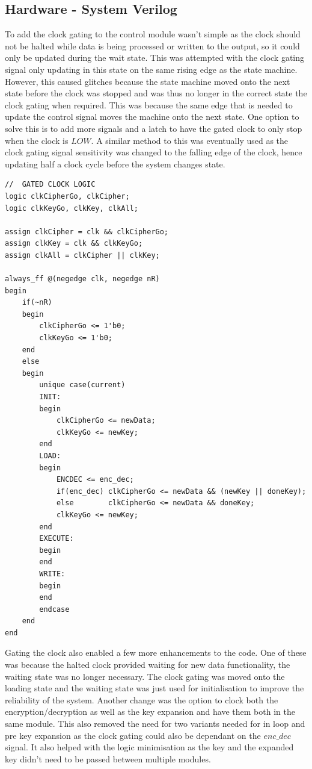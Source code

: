 \documentclass[12pt,twoside,a4paper]{report}
\begin{document}
	\subsection{Hardware - System Verilog}
	\label{subsection:SV2}
	
	To add the clock gating to the control module wasn't simple as the clock should not be halted while data is being processed or written to the output, so it could only be updated during the wait state. This was attempted with the clock gating signal only updating in this state on the same rising edge as the state machine. However, this caused glitches because the state machine moved onto the next state before the clock was stopped and was thus no longer in the correct state the clock gating when required. This was because the same edge that is needed to update the control signal moves the machine onto the next state. One option to solve this is to add more signals and a latch to have the gated clock to only stop when the clock is $LOW$. A similar method to this was eventually used as the clock gating signal sensitivity was changed to the falling edge of the clock, hence updating half a clock cycle before the system changes state.

	\begin{minipage}{\linewidth}
	\begin{lstlisting}[label={lst:Clock_Gating},caption={The next state logic for the ($PRE$) control module},style=SVStyle]
//	GATED CLOCK LOGIC
logic clkCipherGo, clkCipher;
logic clkKeyGo, clkKey, clkAll;

assign clkCipher = clk && clkCipherGo;
assign clkKey = clk && clkKeyGo;
assign clkAll = clkCipher || clkKey;

always_ff @(negedge clk, negedge nR)
begin
	if(~nR)
	begin
		clkCipherGo <= 1'b0;
		clkKeyGo <= 1'b0;
	end
	else
	begin
		unique case(current)
		INIT:
		begin
			clkCipherGo <= newData;
			clkKeyGo <= newKey;
		end
		LOAD:
		begin
			ENCDEC <= enc_dec;
			if(enc_dec)	clkCipherGo <= newData && (newKey || doneKey);
			else		clkCipherGo <= newData && doneKey;
			clkKeyGo <= newKey;
		end
		EXECUTE:
		begin
		end
		WRITE:
		begin
		end
		endcase
	end
end
	\end{lstlisting}
	\end{minipage}
	
	Gating the clock also enabled a few more enhancements to the code. One of these was because the halted clock provided waiting for new data functionality, the waiting state was no longer necessary. The clock gating was moved onto the loading state and the waiting state was just used for initialisation to improve the reliability of the system. Another change was the option to clock both the encryption/decryption as well as the key expansion and have them both in the same module. This also removed the need for two variants needed for in loop and pre key expansion as the clock gating could also be dependant on the $enc\_dec$ signal. It also helped with the logic minimisation as the key and the expanded key didn't need to be passed between multiple modules.
	
\end{document}
